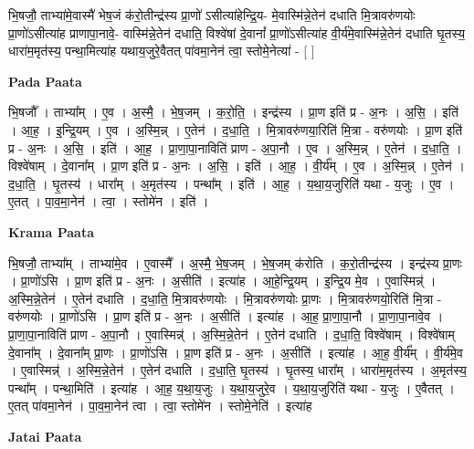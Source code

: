 \documentclass[17pt]{extarticle}
\begin{document}
भि॒षजौ॒ ताभ्या॑मे॒वास्मै॑ भेष॒जं क॑रो॒तीन्द्र॑स्य प्रा॒णो॑ ऽसीत्या॑हेन्द्रि॒य- मे॒वास्मि॑न्ने॒तेन॑ दधाति मि॒त्रावरु॑णयोः प्रा॒णो॑ऽसीत्या॑ह प्राणापा॒नावे॒- वास्मि॑न्ने॒तेन॑ दधाति॒ विश्वे॑षां दे॒वानां᳚ प्रा॒णो॑ऽसीत्या॑ह वी॒र्य॑मे॒वास्मि॑न्ने॒तेन॑ दधाति घृ॒तस्य॒ धारा॑म॒मृत॑स्य॒ पन्था॒मित्या॑ह यथाय॒जुरे॒वैतत् पा॑वमा॒नेन॑ त्वा॒ स्तोमे॒नेत्या॑ - [  ] \newline

\textbf{Pada Paata} \newline

भि॒षजौ᳚ । ताभ्या᳚म् । ए॒व । अ॒स्मै॒ । भे॒ष॒जम् । क॒रो॒ति॒ । इन्द्र॑स्य । प्रा॒ण इति॑ प्र - अ॒नः । अ॒सि॒ । इति॑ । आ॒ह॒ । इ॒न्द्रि॒यम् । ए॒व । अ॒स्मि॒न्न् । ए॒तेन॑ । द॒धा॒ति॒ । मि॒त्रावरु॑णया॒रिति॑ मि॒त्रा - वरु॑णयोः । प्रा॒ण इति॑ प्र - अ॒नः । अ॒सि॒ । इति॑ । आ॒ह॒ । प्रा॒णा॒पा॒नाविति॑ प्राण - अ॒पा॒नौ । ए॒व । अ॒स्मि॒न्न् । ए॒तेन॑ । द॒धा॒ति॒ । विश्वे॑षाम् । दे॒वाना᳚म् । प्रा॒ण इति॑ प्र - अ॒नः । अ॒सि॒ । इति॑ । आ॒ह॒ । वी॒र्य᳚म् । ए॒व । अ॒स्मि॒न्न् । ए॒तेन॑ । द॒धा॒ति॒ । घृ॒तस्य॑ । धारा᳚म् । अ॒मृत॑स्य । पन्था᳚म् । इति॑ । आ॒ह॒ । य॒था॒य॒जुरिति॑ यथा - य॒जुः । ए॒व । ए॒तत् । पा॒व॒मा॒नेन॑ । त्वा॒ । स्तोमे॑न । इति॑ ।  \newline


\textbf{Krama Paata} \newline

भि॒षजौ॒ ताभ्या᳚म् । ताभ्या॑मे॒व । ए॒वास्मै᳚ । अ॒स्मै॒ भे॒ष॒जम् । भे॒ष॒जम् क॑रोति । क॒रो॒तीन्द्र॑स्य । इन्द्र॑स्य प्रा॒णः । प्रा॒णो॑ऽसि । प्रा॒ण इति॑ प्र - अ॒नः । अ॒सीति॑ । इत्या॑ह । आ॒हे॒न्द्रि॒यम् । इ॒न्द्रि॒य मे॒व । ए॒वास्मिन्न्॑ । अ॒स्मि॒न्ने॒तेन॑ । ए॒तेन॑ दधाति । द॒धा॒ति॒ मि॒त्रावरु॑णयोः । मि॒त्रावरु॑णयोः प्रा॒णः । मि॒त्रावरु॑णयो॒रिति॑ मि॒त्रा - वरु॑णयोः । प्रा॒णो॑ऽसि । प्रा॒ण इति॑ प्र - अ॒नः । अ॒सीति॑ । इत्या॑ह । आ॒ह॒ प्रा॒णा॒पा॒नौ । प्रा॒णा॒पा॒नावे॒व । प्रा॒णा॒पा॒नाविति॑ प्राण - अ॒पा॒नौ । ए॒वास्मिन्न्॑ । अ॒स्मि॒न्ने॒तेन॑ । ए॒तेन॑ दधाति । द॒धा॒ति॒ विश्वे॑षाम् । विश्वे॑षाम् दे॒वाना᳚म् । दे॒वाना᳚म् प्रा॒णः । प्रा॒णो॑ऽसि । प्रा॒ण इति॑ प्र - अ॒नः । अ॒सीति॑ । इत्या॑ह । आ॒ह॒ वी॒र्य᳚म् । वी॒र्य॑मे॒व । ए॒वास्मिन्न्॑ । अ॒स्मि॒न्ने॒तेन॑ । ए॒तेन॑ दधाति । द॒धा॒ति॒ घृ॒तस्य॑ । घृ॒तस्य॒ धारा᳚म् । धारा॑म॒मृत॑स्य । अ॒मृत॑स्य॒ पन्था᳚म् । पन्था॒मिति॑ । इत्या॑ह । आ॒ह॒ य॒था॒य॒जुः । य॒था॒य॒जुरे॒व । य॒था॒य॒जुरिति॑ यथा - य॒जुः । ए॒वैतत् । ए॒तत् पा॑वमा॒नेन॑ । पा॒व॒मा॒नेन॑ त्वा । त्वा॒ स्तोमे॑न । स्तोमे॒नेति॑ । इत्या॑ह \newline

\textbf{Jatai Paata} \newline
\end{document}
